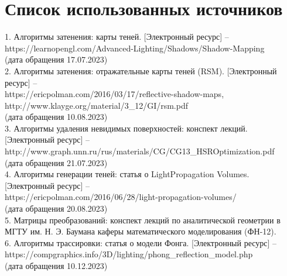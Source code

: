 \chapter*{Список использованных источников}

\hspace{-1.25cm}
1. Алгоритмы затенения: карты теней.
[Электронный ресурс] -- \\
{https://learnopengl.com/Advanced-Lighting/Shadows/Shadow-Mapping} \\
(дата обращения 17.07.2023) \\

\hspace{-1.25cm}
2. Алгоритмы затенения: отражательные карты теней (RSM).
[Электронный ресурс] -- \\
{https://ericpolman.com/2016/03/17/reflective-shadow-maps}, \\
{http://www.klayge.org/material/3\_12/GI/rsm.pdf} \\
(дата обращения 10.08.2023) \\

\hspace{-1.25cm}
3. Алгоритмы удаления невидимых поверхностей: конспект лекций.
[Электронный ресурс] -- \\
{http://www.graph.unn.ru/rus/materials/CG/CG13\_HSROptimization.pdf} \\
(дата обращения 21.07.2023) \\

\hspace{-1.25cm}
4. Алгоритмы генерации теней: статья о LightPropagation Volumes.
[Электронный ресурс] -- \\
{https://ericpolman.com/2016/06/28/light-propagation-volumes/} \\
(дата обращения 20.08.2023) \\

\hspace{-1.25cm}
5. Матрицы преобразований: конспект лекций по аналитической геометрии в
МГТУ им. Н. Э. Баумана каферы математического моделирования (ФН-12). \\

\hspace{-1.25cm}
6. Алгоритмы трассировки: статья о модели Фонга.
[Электронный ресурс] -- \\
{https://compgraphics.info/3D/lighting/phong\_reflection\_model.php} \\
(дата обращения 10.12.2023) \\


